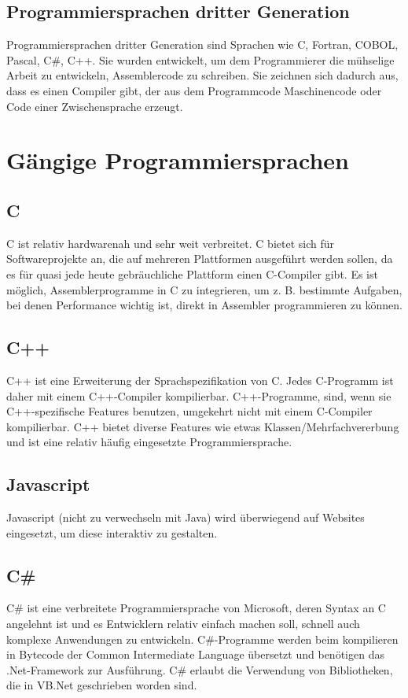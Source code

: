 \begin{multicols}{3}
\subsection{Programmiersprachen dritter Generation}
Programmiersprachen dritter Generation sind Sprachen wie C, Fortran, COBOL, Pascal, C\#, C++. Sie wurden entwickelt, um dem Programmierer die mühselige Arbeit zu entwickeln, Assemblercode zu schreiben. Sie zeichnen sich dadurch aus, dass es einen Compiler gibt, der aus dem Programmcode Maschinencode oder Code einer Zwischensprache erzeugt.
\section{Gängige Programmiersprachen}
\subsection{C}
C ist relativ hardwarenah und sehr weit verbreitet. C bietet sich für Softwareprojekte an, die auf mehreren Plattformen ausgeführt werden sollen, da es für quasi jede heute gebräuchliche Plattform einen C-Compiler gibt. Es ist möglich, Assemblerprogramme in C zu integrieren, um z. B. bestimmte Aufgaben, bei denen Performance wichtig ist, direkt in Assembler programmieren zu können.
\subsection{C++}
C++ ist eine Erweiterung der Sprachspezifikation von C. Jedes C-Programm ist daher mit einem C++-Compiler kompilierbar. C++-Programme, sind, wenn sie C++-spezifische Features benutzen, umgekehrt nicht mit einem C-Compiler kompilierbar. C++ bietet diverse Features wie etwas Klassen/Mehrfachvererbung und ist eine relativ häufig eingesetzte Programmiersprache.
\subsection{Javascript}
Javascript (nicht zu verwechseln mit Java) wird überwiegend auf Websites eingesetzt, um diese interaktiv zu gestalten.
\subsection{C\#}
C\# ist eine verbreitete Programmiersprache von Microsoft, deren Syntax an C angelehnt ist und es Entwicklern relativ einfach machen soll, schnell auch komplexe Anwendungen zu entwickeln. C\#-Programme werden beim kompilieren in Bytecode der Common Intermediate Language übersetzt und benötigen das .Net-Framework zur Ausführung. C\# erlaubt die Verwendung von Bibliotheken, die in VB.Net geschrieben worden sind.

\end{multicols}
